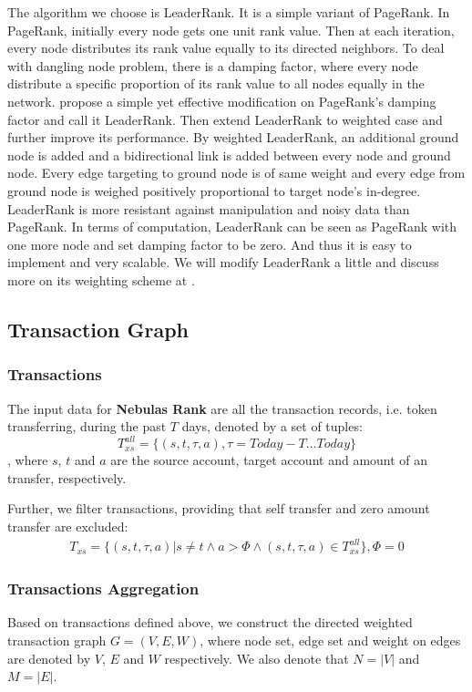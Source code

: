 The algorithm we choose is LeaderRank\cite{Chen2013}\cite{Li2014}. It is a simple variant of PageRank\cite{Brin2010}\cite{page1999pagerank}. In PageRank, initially every node gets one unit rank value. Then at each iteration, every node distributes its rank value equally to its directed neighbors. To deal with dangling node problem, there is a damping factor, where every node distribute a specific proportion of its rank value to all nodes equally in the network. \textcite{Chen2013} propose a simple yet effective modification on PageRank's damping factor and call it LeaderRank. Then \textcite{Li2014} extend LeaderRank to weighted case and further improve its performance. By weighted LeaderRank\cite{Li2014}, an additional ground node is added and a bidirectional link is added between every node and ground node. Every edge targeting to ground node is of same weight and every edge from ground node is weighed positively proportional to target node's in-degree. LeaderRank is more resistant against manipulation and noisy data than PageRank\cite{Chen2013}\cite{Li2014}\cite{Lu2016}. In terms of computation, LeaderRank can be seen as PageRank with one more node and set damping factor to be zero. And thus it is easy to implement and very scalable. We will modify LeaderRank a little and discuss more on its weighting scheme at .

\subsection{Transaction Graph} \label{sec:txg}

\subsubsection{Transactions}\label{subsec:transfer}
The input data for \textbf{Nebulas Rank} are all the transaction records, i.e. token transferring, during the past $T$ days, denoted by a set of tuples:
$$
	T_{xs}^{all} = \{(s,t,\tau, a), \tau = Today-T \dots Today \}
$$
, where $s$, $t$ and $a$ are the source account, target account and amount of an transfer, respectively.

Further, we filter transactions, providing that self transfer and zero amount transfer are excluded: 
\begin{align}
	T_{xs} = \{(s,t,\tau, a)| s \neq t \land a > \Phi \land (s,t,\tau, a) \in T_{xs}^{all} \}, \Phi = 0
\end{align}

\subsubsection{Transactions Aggregation} \label{subsec:aggreate}
 Based on transactions defined above, we construct the directed weighted transaction graph $G=(V, E, W)$, where node set, edge set and weight on edges are denoted by $V$, $E$ and $W$ respectively. We also denote that $N = |V|$ and $M = |E|$.

